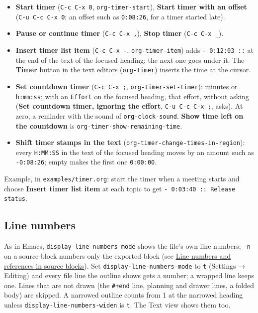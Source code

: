 \documentclass[11pt]{article}
\begin{document}
\begin{itemize}
\item \textbf{Start timer} (\texttt{C-c C-x 0}, \texttt{org-timer-start}), \textbf{Start timer with an offset} (\texttt{C-u C-c C-x 0}; an offset such as \texttt{0:08:26}, for a timer started late).
\item \textbf{Pause or continue timer} (\texttt{C-c C-x ,}), \textbf{Stop timer} (\texttt{C-c C-x \_}).
\item \textbf{Insert timer list item} (\texttt{C-c C-x -}, \texttt{org-timer-item}) adds \texttt{- 0:12:03 ::} at the end of the text of the focused heading; the next one goes under it. The \textbf{Timer} button in the text editors (\texttt{org-timer}) inserts the time at the cursor.
\item \textbf{Set countdown timer} (\texttt{C-c C-x ;}, \texttt{org-timer-set-timer}): minutes or \texttt{h:mm:ss}; with an \texttt{Effort} on the focused heading, that effort, without asking (\textbf{Set countdown timer, ignoring the effort}, \texttt{C-u C-c C-x ;}, asks). At zero, a reminder with the sound of \texttt{org-clock-sound}. \textbf{Show time left on the countdown} is \texttt{org-timer-show-remaining-time}.
\item \textbf{Shift timer stamps in the text} (\texttt{org-timer-change-times-in-region}): every \texttt{H:MM:SS} in the text of the focused heading moves by an amount such as \texttt{-0:08:26}; empty makes the first one \texttt{0:00:00}.
\end{itemize}

Example, in \texttt{examples/timer.org}: start the timer when a meeting starts and choose \textbf{Insert timer list item} at each topic to get \texttt{- 0:03:40 :: Release status}.

\subsection{Line numbers}
\label{sec:org31dd5c0}
As in Emacs, \texttt{display-line-numbers-mode} shows the file's own line numbers; \texttt{-n} on a source block numbers only the exported block (see \hyperref[sec:org14cbc7b]{Line numbers and references in source blocks}). Set \texttt{display-line-numbers-mode} to \texttt{t} (Settings → Editing) and every file line the outline shows gets a number; a wrapped line keeps one. Lines that are not drawn (the \texttt{\#+end} line, planning and drawer lines, a folded body) are skipped. A narrowed outline counts from 1 at the narrowed heading unless \texttt{display-line-numbers-widen} is \texttt{t}. The Text view shows them too.
\end{document}
